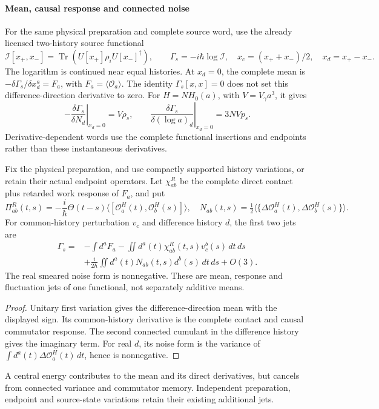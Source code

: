 \documentclass[12pt,a4paper]{article}
\begin{document}
\paragraph{Mean, causal response and connected noise}
For the same physical preparation and complete source word, use the
already licensed two-history source functional
\[
 \mathcal I[x_+,x_-]
 =\operatorname{Tr}(U[x_+]\rho_iU[x_-]^\dagger),\qquad
 \Gamma_s=-i\hbar\log\mathcal I,
 \quad x_c=(x_++x_-)/2,\quad x_d=x_+-x_-.
\]
The logarithm is continued near equal histories.  At \(x_d=0\), the
complete mean is \(-\delta\Gamma_s/\delta x_d^a=F_a\), with
\(F_a=\langle\mathcal O_a\rangle\).  The identity
\(\Gamma_s[x,x]=0\) does not set this difference-direction derivative
to zero.  For \(H=NH_0(a)\), with \(V=V_\gamma a^3\), it gives
\[
 -\left.\frac{\delta\Gamma_s}{\delta N_d}\right|_{x_d=0}=V\rho_s,
 \qquad
 \left.\frac{\delta\Gamma_s}{\delta(\log a)_d}\right|_{x_d=0}=3NVp_s.
\]
Derivative-dependent words use the complete functional insertions and
endpoints rather than these instantaneous derivatives.

\begin{theorem}
\label{p4:thm:v2203-causal-mean-response-noise}
Fix the physical preparation, and use compactly supported history
variations, or retain their actual endpoint operators.  Let
\(\chi^R_{ab}\) be the complete direct contact plus retarded work
response of \(F_a\), and put
\[
 \Pi^R_{ab}(t,s)=-\frac{i}{\hbar}\Theta(t-s)
  \langle[\mathcal O_a^H(t),\mathcal O_b^H(s)]\rangle,
 \quad
 N_{ab}(t,s)=\tfrac12
  \langle\{\Delta\mathcal O_a^H(t),\Delta\mathcal O_b^H(s)\}\rangle.
\]
For common-history perturbation \(v_c\) and difference history \(d\),
the first two jets are
\[
 \boxed{\begin{aligned}
 \Gamma_s={}&-\int d^aF_a
 -\iint d^a(t)\chi^R_{ab}(t,s)v_c^b(s)\,dt\,ds\\
 &+\frac{i}{2\hbar}\iint d^a(t)N_{ab}(t,s)d^b(s)\,dt\,ds+O(3).
 \end{aligned}}
\]
The real smeared noise form is nonnegative.  These are mean, response
and fluctuation jets of one functional, not separately additive means.
\end{theorem}
\begin{proof}
Unitary first variation gives the difference-direction mean with the
displayed sign.  Its common-history derivative is the complete contact
and causal commutator response.  The second connected cumulant in the
difference history gives the imaginary term.  For real \(d\), its
noise form is the variance of
\(\int d^a(t)\Delta\mathcal O_a^H(t)\,dt\), hence is nonnegative.
\end{proof}
A central energy contributes to the mean and its direct derivatives,
but cancels from connected variance and commutator memory.  Independent
preparation, endpoint and source-state variations retain their existing
additional jets.
\end{document}
